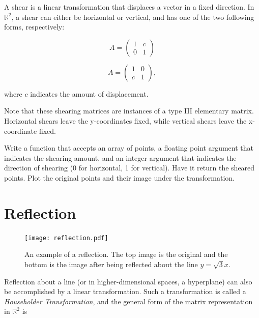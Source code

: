 A shear is a linear transformation that displaces a vector in a fixed direction. In $\mathbb{R}^2$, a shear can either be horizontal or vertical, and has one of the two following forms, respectively:

\[
A = \begin{pmatrix}
1 & c \\
0 & 1
\end{pmatrix}
\]

\[
A = \begin{pmatrix}
1 & 0 \\
c & 1
\end{pmatrix},
\]

where $c$ indicates the amount of displacement.  

Note that these shearing matrices are instances of a type III elementary matrix. Horizontal shears leave the y-coordinates fixed, while vertical shears leave the x-coordinate fixed. 

\begin{problem}
Write a function that accepts an array of points, a floating point argument that indicates the shearing amount, and an integer argument
that indicates the direction of shearing (0 for horizontal, 1 for vertical). Have it return the sheared points.
Plot the original points and their image under the transformation.
\end{problem}

\section*{Reflection}

\begin{figure}
\centering
\texttt{[image: reflection.pdf]}
\caption{An example of a reflection. The top image is the original and the bottom is the image after being reflected about the line $y = \sqrt{3}x$.}
\label{basis:reflection}
\end{figure}

Reflection about a line (or in higher-dimensional spaces, a hyperplane) can also be accomplished by a linear transformation. Such a transformation is called a \emph{Householder Transformation}, and the general form of the matrix representation in
$\mathbb{R}^2$ is

